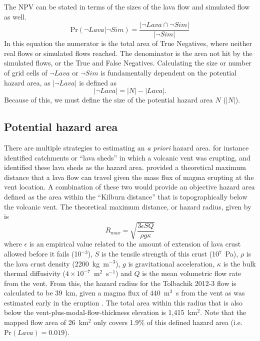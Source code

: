 		The NPV can be stated in terms of the sizes of the lava flow and simulated flow as well.
		\begin{equation}
			\text{Pr}(\neg Lava|\neg Sim)=\frac{|\neg Lava\cap \neg Sim|}{|\neg Sim|}\label{eq_simplenegpost}
		\end{equation}
		In this equation the numerator is the total area of True Negatives, where neither real flows or simulated flows reached. The denominator is the area not hit by the simulated flows, or the True and False Negatives. Calculating the size or number of grid cells of $\neg Lava$ or $\neg Sim$ is fundamentally dependent on the potential hazard area, as $|\neg Lava|$ is defined as
		\begin{equation}
			|\neg Lava| = |N| - |Lava|.
		\end{equation}
		Because of this, we must define the size of the potential hazard area $N$ ($|N|$).	
	
	\subsection{Potential hazard area} There are multiple strategies to estimating an \textit{a priori} hazard area. \citet{kauahikaua1995applications} for instance identified catchments or ``lava sheds'' in which a volcanic vent was erupting, and identified these lava sheds as the hazard area. \citet{kilburn2000lava} provided a theoretical maximum distance that a lava flow can travel given the mass flux of magma erupting at the vent location. A combination of these two would provide an objective hazard area defined as the area within the ``Kilburn distance'' that is topographically below the volcanic vent. The theoretical maximum distance, or hazard radius, given by \citet{kilburn2000lava} is
		\begin{equation}
		R_{max}=\sqrt{\frac{3\epsilon SQ}{\rho g\kappa}}
		\label{eq_kilburn}
		\end{equation}
	where $\epsilon$ is an empirical value related to the amount of extension of lava crust allowed before it fails (10$^{-3}$), $S$ is the tensile strength of this crust (10$^7$~Pa), $\rho$ is the lava crust density (2200~kg~m$^{-3}$), $g$ is gravitational acceleration, $\kappa$ is the bulk thermal diffusivity ($4\times 10^{-7}$~m$^{2}$~s$^{-1}$) and $Q$ is the mean volumetric flow rate from the vent. From this, the hazard radius for the Tolbachik 2012-3 flow is calculated to be 39~km, given a magma flux of 440~m$^3$~s from the vent as was estimated early in the eruption \citep{belousov2015overview}. The total area within this radius that is also below the vent-plus-modal-flow-thickness elevation is 1,415~km$^2$. Note that the mapped flow area of 26~km$^2$ only covers 1.9\% of this defined hazard area (i.e. $\text{Pr}(Lava) = 0.019$).
	
